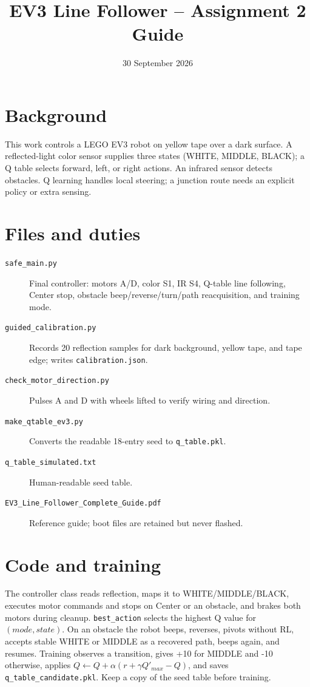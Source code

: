 \documentclass[11pt]{article}
\title{EV3 Line Follower -- Assignment 2 Guide}
\date{30 September 2026}
\begin{document}
\maketitle
\section{Background}
This work controls a LEGO EV3 robot on yellow tape over a dark surface. A reflected-light color sensor supplies three states (WHITE, MIDDLE, BLACK); a Q table selects forward, left, or right actions. An infrared sensor detects obstacles. Q learning handles local steering; a junction route needs an explicit policy or extra sensing.
\section{Files and duties}
\begin{description}
\item[\texttt{safe\_main.py}] Final controller: motors A/D, color S1, IR S4, Q-table line following, Center stop, obstacle beep/reverse/turn/path reacquisition, and training mode.
\item[\texttt{guided\_calibration.py}] Records 20 reflection samples for dark background, yellow tape, and tape edge; writes \texttt{calibration.json}.
\item[\texttt{check\_motor\_direction.py}] Pulses A and D with wheels lifted to verify wiring and direction.
\item[\texttt{make\_qtable\_ev3.py}] Converts the readable 18-entry seed to \texttt{q\_table.pkl}.
\item[\texttt{q\_table\_simulated.txt}] Human-readable seed table.
\item[\texttt{EV3\_Line\_Follower\_Complete\_Guide.pdf}] Reference guide; boot files are retained but never flashed.
\end{description}
\section{Code and training}
The controller class reads reflection, maps it to WHITE/MIDDLE/BLACK, executes motor commands and stops on Center or an obstacle, and brakes both motors during cleanup. \texttt{best\_action} selects the highest Q value for $(mode,state)$. On an obstacle the robot beeps, reverses, pivots without RL, accepts stable WHITE or MIDDLE as a recovered path, beeps again, and resumes. Training observes a transition, gives +10 for MIDDLE and -10 otherwise, applies $Q\leftarrow Q+\alpha(r+\gamma Q'_{max}-Q)$, and saves \texttt{q\_table\_candidate.pkl}. Keep a copy of the seed table before training.
\end{document}
